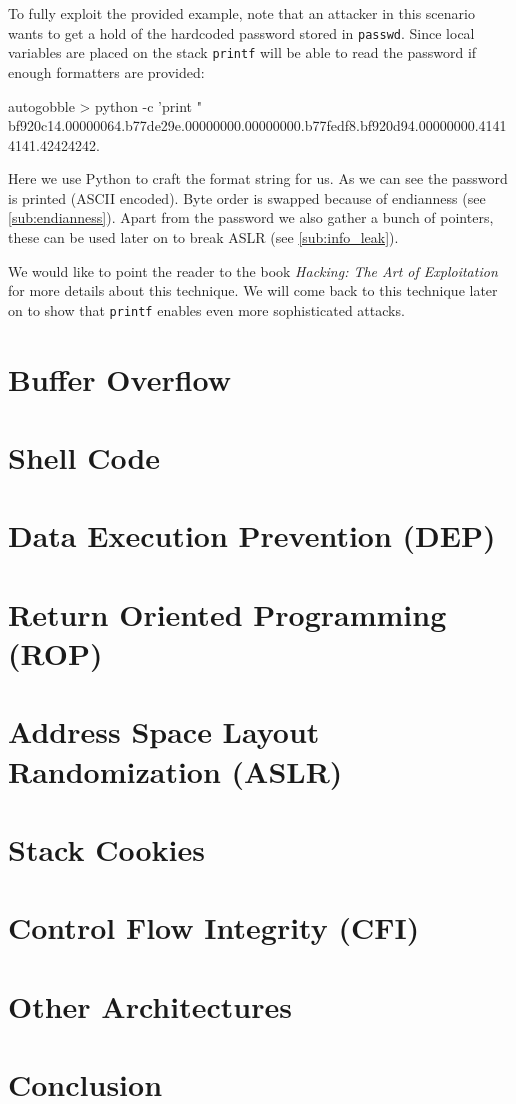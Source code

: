 \documentclass[article]{uibk}
\begin{document}
To fully exploit the provided example, note that an attacker in this scenario
wants to get a hold of the hardcoded password stored in \texttt{passwd}. Since
local variables are placed on the stack \texttt{printf} will be able to read
the password if enough formatters are provided:

\begin{pre*} {autogobble}
    > python -c 'print "%
    bf920c14.00000064.b77de29e.00000000.00000000.b77fedf8.bf920d94.00000000.41414141.42424242.
\end{pre*}

Here we use Python to craft the format string for us. As we can see the
password is printed (ASCII encoded). Byte order is swapped because of
endianness (see \cref{sub:endianness}). Apart from the password we also gather
a bunch of pointers, these can be used later on to break ASLR (see
\cref{sub:info_leak}).

We would like to point the reader to the book \textit{Hacking: The Art of
Exploitation} \cite[pp.~167]{art_of_exploitation} for more details about this
technique. We will come back to this technique later on to show that
\texttt{printf} enables even more sophisticated attacks.

\newpage

\section{Buffer Overflow}

\section{Shell Code}

\section{Data Execution Prevention (DEP)}

\section{Return Oriented Programming (ROP)}

\section{Address Space Layout Randomization (ASLR)}

\section{Stack Cookies}

\section{Control Flow Integrity (CFI)}

\section{Other Architectures}

\section{Conclusion}


\end{document}

